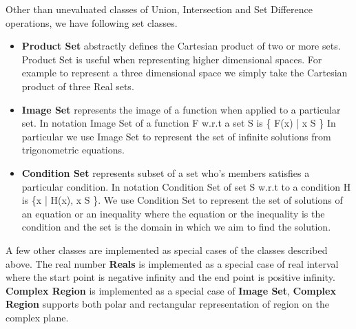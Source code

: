 
Other than unevaluated classes of Union, Intersection and Set Difference
operations, we have following set classes.

\begin{itemize}

    \item \textbf{Product Set} abstractly defines the Cartesian product of two
        or more sets. Product Set is useful when representing higher
        dimensional spaces. For example to represent a three dimensional space
        we simply take the Cartesian product of three Real sets.

    \item \textbf{Image Set} represents the image of a function when applied to
        a particular set. In notation Image Set of a function F w.r.t a set S
        is \{ F(x) | x \in S \} In particular we use Image Set to represent the
        set of infinite solutions from trigonometric equations.


    \item \textbf{Condition Set} represents subset of a set who's members
        satisfies a particular condition. In notation Condition Set of set S
        w.r.t to a condition H is \{x | H(x), x \in S \}. We use Condition Set
        to represent the set of solutions of an equation or an inequality where
        the equation or the inequality is the condition and the set is the
        domain in which we aim to find the solution.


\end{itemize}

A few other classes are implemented as special cases of the classes described
above. The real number \textbf{Reals} is implemented as a special case of real
interval where the start point is negative infinity and the end point is
positive infinity. \textbf{Complex Region} is implemented as a special case of
\textbf{Image Set}, \textbf{Complex Region} supports both polar and rectangular
representation of region on the complex plane.



